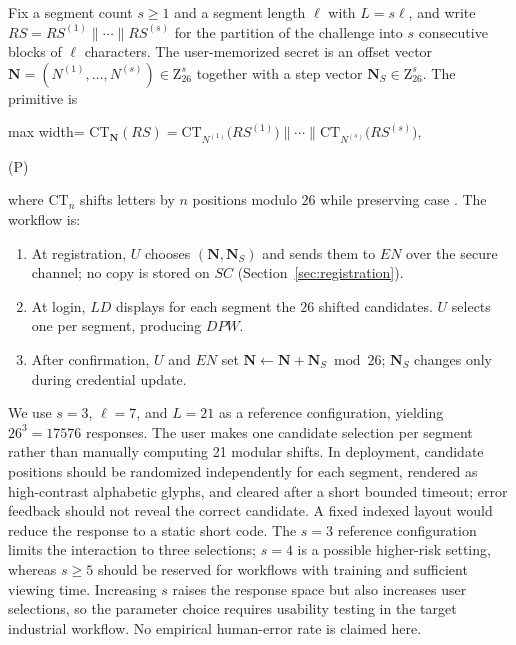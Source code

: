 \documentclass[cmc,article,submit,moreauthors,pdftex]{Definitions/tsp}
\renewcommand{\mathsf}[1]{\mathrm{#1}}
\renewcommand{\mathbb}[1]{\mathrm{#1}}
\newcommand{\cc}{\mathbin{\|}}
\newcommand{\CT}{\mathsf{CT}}
\newcounter{protoeq} %
\newenvironment{ceq}{%
  \refstepcounter{protoeq}%
  \par\vspace{-3pt}\setlength{\topsep}{0pt}\setlength{\partopsep}{0pt}\begin{center}%
}{%
  \hspace{0.45em}\textup{(P\theprotoeq)}%
  \end{center}\vspace{-3pt}%
} %
\providecommand{\DIFadd}[1]{{\protect\color{blue} \sf #1}} %
\providecommand{\DIFaddbegin}{} %
\providecommand{\DIFaddend}{} %
\providecommand{\DIFdelbegin}{} %
\providecommand{\DIFdelend}{} %
\begin{document}
Fix a segment count $s\ge 1$ and a segment length $\ell$ with $L=s\ell$, and write $RS=RS^{(1)}\cc\cdots\cc RS^{(s)}$ for the partition of the challenge into $s$ consecutive blocks of $\ell$ characters. The user-memorized secret is an offset vector $\mathbf{N}=(N^{(1)},\dots,N^{(s)})\in\mathbb{Z}_{26}^{s}$ together with a step vector $\mathbf{N}_S\in\mathbb{Z}_{26}^{s}$. The primitive is

\DIFdelbegin %
\DIFdelend \DIFaddbegin \begin{ceq}
\DIFaddend \begin{adjustbox}{max width=\columnwidth}
$\displaystyle \CT_{\mathbf{N}}(RS)=\CT_{N^{(1)}}\bigl(RS^{(1)}\bigr)\cc\cdots\cc\CT_{N^{(s)}}\bigl(RS^{(s)}\bigr),$
\end{adjustbox}
\DIFdelbegin %
\DIFdelend \DIFaddbegin \end{ceq}
\DIFaddend 

where $\CT_n$ shifts letters by $n$ positions modulo $26$ while preserving case \cite{qowi}. The workflow is:

\begin{enumerate}
\item At registration, $U$ chooses $(\mathbf{N},\mathbf{N}_S)$ and sends them to $EN$ over the secure channel; no copy is stored on $SC$ (Section~\ref{sec:registration}).
\item At login, $LD$ displays for each segment the $26$ shifted candidates. $U$ selects one per segment, producing $DPW$.
\item After confirmation, $U$ and $EN$ set $\mathbf{N}\leftarrow\mathbf{N}+\mathbf{N}_S\bmod26$; $\mathbf{N}_S$ changes only during credential update.
\end{enumerate}

We use $s=3$, $\ell=7$, and $L=21$ \DIFaddbegin \DIFadd{as a reference configuration}\DIFaddend , yielding $26^3=17576$ responses. \DIFaddbegin \DIFadd{The user makes one candidate selection per segment rather than manually computing 21 modular shifts. In deployment, candidate positions should be randomized independently for each segment, rendered as high-contrast alphabetic glyphs, and cleared after a short bounded timeout; error feedback should not reveal the correct candidate. A fixed indexed layout would reduce the response to a static short code. The $s=3$ reference configuration limits the interaction to three selections; $s=4$ is a possible higher-risk setting, whereas $s\ge5$ should be reserved for workflows with training and sufficient viewing time. Increasing $s$ raises the response space but also increases user selections, so the parameter choice requires usability testing in the target industrial workflow. No empirical human-error rate is claimed here.
}\DIFaddend 
\end{document}
